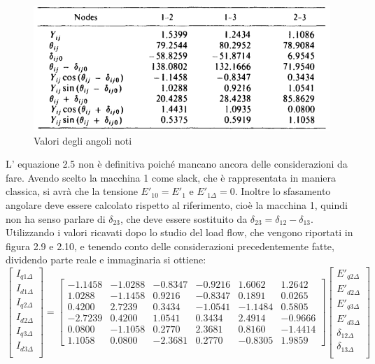 \documentclass[Lau,noexaminfo]{sapthesis}
\begin{document}
	\begin{figure}
		\centering
		\includegraphics[height=0.2\textheight]{valori_loadflow2}
		\caption{Valori degli angoli noti}
	\end{figure}
	L' equazione 2.5 non è definitiva poiché mancano ancora delle considerazioni da fare. Avendo scelto la macchina 1 come slack, che è rappresentata in maniera classica, si avrà che la tensione $E'_{10}=E'_1$ e $E'_{1\Delta}=0$. Inoltre lo sfasamento angolare deve essere calcolato rispetto al riferimento, cioè la macchina 1, quindi non ha senso parlare di $\delta_{23}$, che deve essere sostituito da $\delta_{23}=\delta_{12}-\delta_{13}$. Utilizzando i valori ricavati dopo lo studio del load flow, che vengono riportati in figura 2.9 e 2.10, e tenendo conto delle considerazioni precedentemente fatte, dividendo parte reale e immaginaria si ottiene:\\
	\begin{equation}
	\begin{bmatrix}
	I_{q1\Delta}\\
	I_{d1\Delta}\\
	I_{q2\Delta}\\
	I_{d2\Delta}\\
	I_{q3\Delta}\\
	I_{d3\Delta}\\
	\end{bmatrix}=
	\begin{bmatrix}
	-1.1458 & -1.0288 & -0.8347 & -0.9216 & 1.6062 & 1.2642\\
	1.0288 & -1.1458 & 0.9216 & -0.8347 & 0.1891 & 0.0265\\
	0.4200 & 2.7239 & 0.3434 & -1.0541 & -1.1484 & 0.5805\\
	-2.7239 & 0.4200 & 1.0541 & 0.3434 & 2.4914 & -0.9666\\
	0.0800 & -1.1058 & 0.2770 & 2.3681 & 0.8160 & -1.4414\\
	1.1058 & 0.0800 & -2.3681 & 0.2770 & -0.8305 & 1.9859
	\end{bmatrix}
	\begin{bmatrix}
	E'_{q2\Delta}\\
	E'_{d2\Delta}\\
	E'_{q3\Delta}\\
	E'_{d3\Delta}\\
	\delta_{12\Delta}\\
	\delta_{13\Delta}\\
	\end{bmatrix}
	\end{equation}
\end{document}
